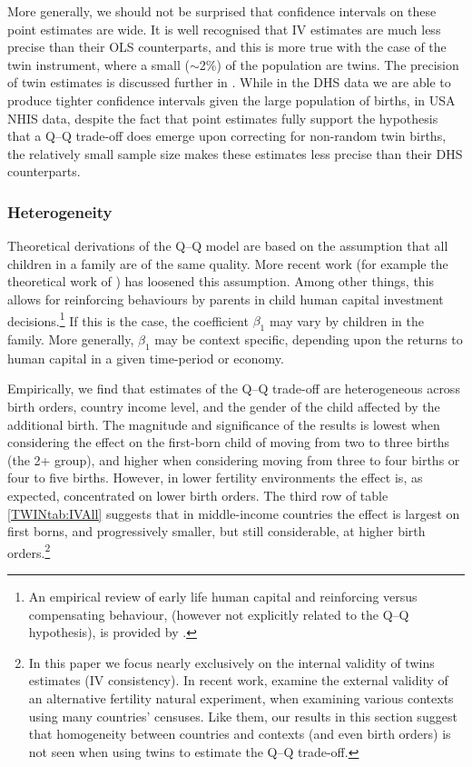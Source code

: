 More generally, we should not be surprised that confidence intervals on these
point estimates are wide.  It is well recognised that IV estimates are much
less precise than their OLS counterparts, and this is more true with the case
of the twin instrument, where a small ($\sim$2\%) of the population are twins.
The precision of twin estimates is discussed further in \citet{Angristetal2010}.
While in the DHS data we are able to produce tighter confidence intervals given
the large population of births, in USA NHIS data, despite the fact that point 
estimates fully support the hypothesis that a Q--Q trade-off does emerge upon 
correcting for non-random twin births, the relatively small sample size makes 
these estimates less precise than their DHS counterparts.


\subsubsection{Heterogeneity}
Theoretical derivations of the Q--Q model are based on the assumption that all
children in a family are of the same quality. More recent work (for example the 
theoretical work of \citet{AizerCunha2012}) has loosened this assumption. Among 
other things, this allows for reinforcing behaviours by parents in child human 
capital investment decisions.\footnote{An empirical review of early life human 
capital and reinforcing versus compensating behaviour, (however not explicitly 
related to the Q--Q hypothesis), is provided by \citet{AlmondMazumder2013}.} If 
this is the case, the coefficient $\beta_1$ may vary by children in the family. 
More generally, $\beta_1$ may be context specific, depending upon the returns to 
human capital in a given time-period or economy.

Empirically, we find that estimates of the Q--Q trade-off are heterogeneous 
across birth orders, country income level, and the gender of the child affected 
by the additional birth. The magnitude and significance of the results is lowest 
when considering the effect on the first-born child of moving from two to three 
births (the 2+ group), and higher when considering moving from three to four 
births or four to five births. However, in lower fertility environments the 
effect is, as expected, concentrated on lower birth orders. The third row of 
table \ref{TWINtab:IVAll} suggests that in middle-income countries the effect is 
largest on first borns, and progressively smaller, but still considerable, at 
higher birth orders.\footnote{In this paper we focus nearly exclusively on
the internal validity of twins estimates (IV consistency).  In recent work,
\citet{Deheijaetal2015} examine the external validity of an alternative 
fertility natural experiment, when examining various contexts using many
countries' censuses.  Like them, our results in this section suggest that
homogeneity between countries and contexts (and even birth orders) is not
seen when using twins to estimate the Q--Q trade-off.}

